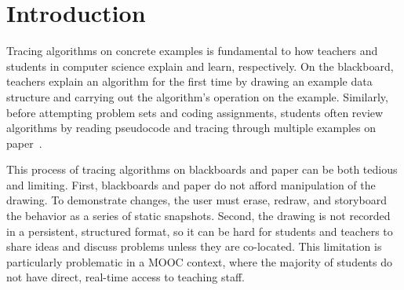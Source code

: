 \section{Introduction}

Tracing algorithms on concrete examples is fundamental to how teachers and students in
computer science explain and learn, respectively. On the blackboard, teachers explain an
algorithm for the first time by drawing an example data structure and carrying
out the algorithm's operation on the example. Similarly, before
attempting problem sets and coding assignments,
students often review algorithms by reading pseudocode and
tracing through multiple examples on paper~\cite{Vainio2007}.

This process of tracing algorithms on blackboards and paper can be both tedious and
limiting. First, blackboards and paper do not afford manipulation of the
drawing. To demonstrate changes, the user must erase, redraw, and
storyboard the behavior as a series of static snapshots.
Second, the drawing is not recorded in a persistent, structured format, so it
can be hard for students and teachers to share ideas and discuss
problems unless they are co-located.
This limitation is particularly problematic in a MOOC context, where the majority of
students do not have direct, real-time access to teaching staff.

